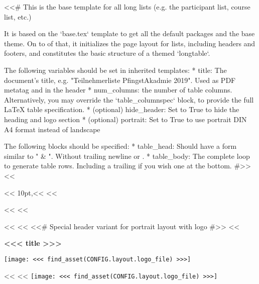 <<# This is the base template for all long lists (e.g. the participant list, course list, etc.)

    It is based on the `base.tex` template to get all the default packages and the base theme. On to of that, it
    initializes the page layout for lists, including headers and footers, and constitutes the basic structure of a
    themed `longtable`.

    The following variables should be set in inherited templates:
      * title: The document's title, e.g. "Teilnehmerliste PfingstAkadmie 2019". Used as PDF metatag and in the header
      * num_columns: the number of table columns. Alternatively, you may override the `table_columnspec` block, to
        provide the full LaTeX table specification.
      * (optional) hide_header: Set to True to hide the heading and logo section
      * (optional) portrait: Set to True to use portrait DIN A4 format instead of landscape

    The following blocks should be specified:
      * table_head: Should have a form similar to " & ". Without trailing newline
        or \hline.
      * table_body: The complete loop to generate table rows. Including a trailing \hline if you wish one at the bottom.
#>>
<<%


<<%
    10pt,<<%
<<%


<<%
    \cfoot[]{}
<<%

<<%
    <<%
        \thispagestyle{plain}
        <<# Special header variant for portrait layout with logo #>>
        <<%
            \begin{minipage}[c]{\textwidth-3cm}%
                \headingfamily\bfseries\huge{}<<< title >>>
            \end{minipage}%
            \begin{minipage}[c]{3cm}%
                \texttt{[image: <<< find\_asset(CONFIG.layout.logo\_file) >>>]}
            \end{minipage}
        <<%
            <<%
                \hspace*{\fill}\texttt{[image: <<< find\_asset(CONFIG.layout.logo\_file) >>>]}\\

